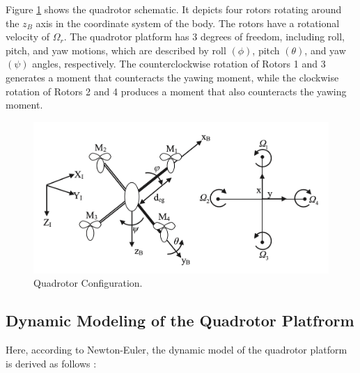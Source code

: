 \documentclass[3p,times]{elsarticle}
\begin{document}

Figure \ref{fig:schematic} shows the quadrotor schematic. It depicts four rotors rotating around the $z_B$ axis in the coordinate system of the body. The rotors have a rotational velocity of $\Omega_r$.
The quadrotor platform has 3 degrees of freedom, including roll, pitch, and yaw motions, which are described by roll $(\phi)$, pitch $(\theta)$, and yaw $(\psi)$ angles, respectively.
The counterclockwise rotation of Rotors 1 and 3 generates a moment that counteracts the yawing moment, while the clockwise rotation of Rotors 2 and 4 produces a moment that also counteracts the yawing moment.

\begin{figure}[H]
    \centering
    \includegraphics[width=12cm]{../Figure/schematic.png}
    \caption{Quadrotor Configuration.}
    \label{fig:schematic}
\end{figure}

\subsection{Dynamic Modeling of the Quadrotor Platfrorm}
Here, according to Newton-Euler, the dynamic model of the quadrotor platform is derived as follows \cite{4399042, article_Bouabdallah}:
\end{document}
